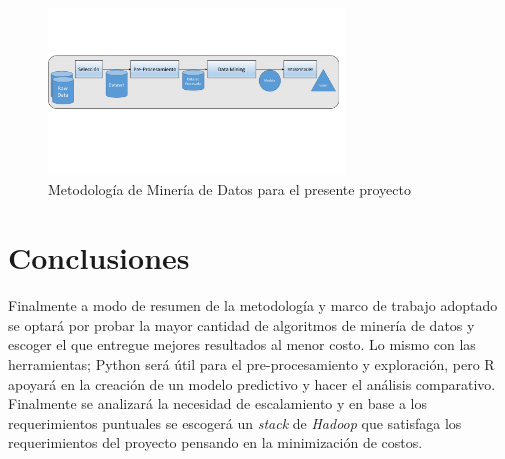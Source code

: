 \begin{figure}[H]
  \centering
    \includegraphics[width=0.7\textwidth]{Figuras/Metodologia}
      \caption{Metodología de Minería de Datos para el presente proyecto}
    \label{fig:metdat}
\end{figure}
\section{Conclusiones}
Finalmente a modo de resumen de la metodología y marco de trabajo adoptado se optará por probar la mayor cantidad de algoritmos de minería de datos y escoger el que entregue mejores resultados al menor costo. Lo mismo con las herramientas; Python será útil para el pre-procesamiento y exploración, pero R apoyará en la creación de un modelo predictivo y hacer el análisis comparativo. Finalmente se analizará la necesidad de escalamiento y en base a los requerimientos puntuales se escogerá un \textit{stack} de \textit{Hadoop} que satisfaga los requerimientos del proyecto pensando en la minimización de costos.